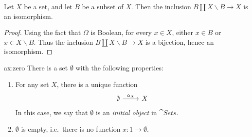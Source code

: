 \begin{prop} Let $X$ be a set, and let $B$ be a subset of $X$.  Then
  the inclusion $B\amalg X\backslash B\to X$ is an
  isomorphism. \label{xmid} \end{prop}

\begin{proof} Using the fact that $\Omega$ is Boolean, for every $x\in
  X$, either $x\in B$ or $x\in X\backslash B$.  Thus the inclusion
  $B\amalg X\backslash B\to X$ is a bijection, hence an
  isomorphism. \end{proof}





\newcommand{\es}{\emptyset}

\begin{axi}{ax:zero} There is a set $\es$ with the
  following properties:
\begin{enumerate}
\item For any set $X$, there is a unique function 
  \[ \begin{tikzcd} \es \arrow[r,"\alpha _X"] & X \end{tikzcd} \] In
  this case, we say that $\es$ is an \emph{initial object} in
  $\cat{Sets}$.
\item $\es$ is empty, i.e.\ there is no function $x:1\to\es$.
\end{enumerate} \label{ax:es} \end{axi}




